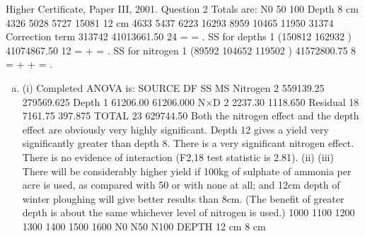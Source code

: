 \documentclass[a4paper,12pt]{article}
\begin{document}


Higher Certificate, Paper III, 2001. Question 2
Totals are:
N0 50 100
Depth 8 cm 4326 5028 5727 15081 12 cm 4633 5437 6223 16293
8959 10465 11950 31374
Correction term
313742 41013661.50
24
= = .
SS for depths 1 (150812 162932 ) 41074867.50
12
= + = .
SS for nitrogen 1 (89592 104652 119502 ) 41572800.75
8
= + + = .

\begin{enumerate}[(a)]
\item 
(i) Completed ANOVA is:
SOURCE DF SS MS
Nitrogen 2 559139.25 279569.625
Depth 1 61206.00 61206.000
N×D 2 2237.30 1118.650
Residual 18 7161.75 397.875
TOTAL 23 629744.50
Both the nitrogen effect and the depth effect are obviously very highly significant.
Depth 12 gives a yield very significantly greater than depth 8. There is a very
significant nitrogen effect.
There is no evidence of interaction (F2,18 test statistic is 2.81).
(ii)
(iii) There will be considerably higher yield if 100kg of sulphate of ammonia per
acre is used, as compared with 50 or with none at all; and 12cm depth of winter
ploughing will give better results than 8cm. (The benefit of greater depth is about the
same whichever level of nitrogen is used.)
1000
1100
1200
1300
1400
1500
1600
N0 N50 N100
DEPTH
12 cm
8 cm
\end{enumerate}
\end{document}
